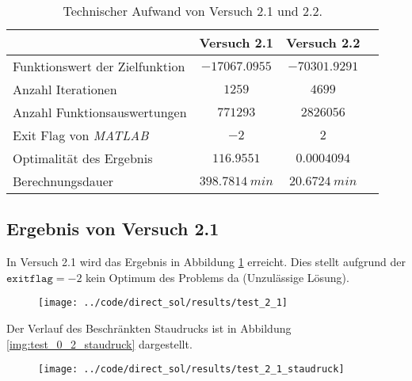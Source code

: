 \begin{table}[H]
    \centering
    \caption{Technischer Aufwand von Versuch 2.1 und 2.2.}\label{tab:Versuch2_TA}
    \begin{tabularx}{.9\textwidth}{Zccc}
        \toprule
         & \textbf{Versuch 2.1} & \textbf{Versuch 2.2} \\
        \midrule
        Funktionswert der Zielfunktion & $-17067.0955$ & $-70301.9291$ \\
        Anzahl Iterationen & $1259$ & $4699$ \\
        Anzahl Funktionsauswertungen & $771293$ & $2826056$ \\
        Exit Flag von \textit{MATLAB} & $-2$ & $2$ \\
        Optimalität des Ergebnis & $116.9551$ & $0.0004094$ \\
        Berechnungsdauer & $398.7814 \ min$ & $20.6724 \ min$ \\
        \bottomrule
    \end{tabularx}
\end{table}




\subsection{Ergebnis von Versuch 2.1}\label{kap:Versuch21}
In Versuch 2.1 wird das Ergebnis in Abbildung \ref{img:test_2_1} erreicht. Dies stellt aufgrund der $\texttt{exitflag} = -2$ kein Optimum des Problems da (Unzulässige Lösung).
\begin{figure}[H]
\begin{center}
\texttt{[image: ../code/direct\_sol/results/test\_2\_1]}
 \label{img:test_2_1}
\end{center}
\end{figure}
Der Verlauf des Beschränkten Staudrucks ist in Abbildung \ref{img:test_0_2_staudruck} dargestellt.
\begin{figure}[H]
\begin{center}
\texttt{[image: ../code/direct\_sol/results/test\_2\_1\_staudruck]}
\label{img:test_2_1_staudruck}
\end{center}
\end{figure}




